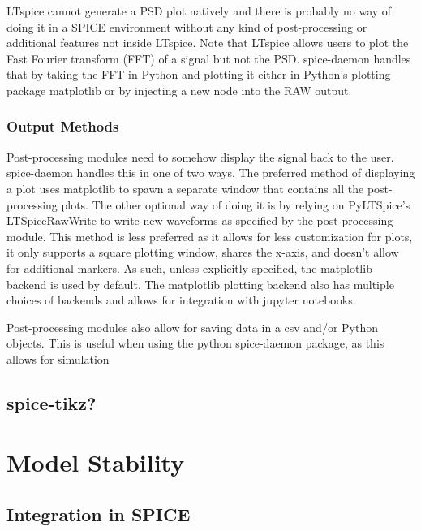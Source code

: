 \documentclass{article}
\newcommand{\todoexplain}[2][]{\todo[color=purple!40, #1]{\textbf{add details:}\\#2}}
\newcommand{\cf}[1]{\textsf{#1}}
\begin{document}
LTspice cannot generate a PSD plot natively and there is probably no way of doing it in a SPICE
environment without any kind of post-processing or additional features not inside LTspice.
Note that LTspice allows users to plot the Fast Fourier transform (FFT) of a signal but not the 
PSD. spice-daemon handles that by taking the FFT in Python and plotting it either in Python's 
plotting package \cf{matplotlib} or by injecting a new node into the RAW output. 


\subsubsection{Output Methods}

Post-processing modules need to somehow display the signal back to the user. spice-daemon handles this
in one of two ways. The preferred method of displaying a plot uses matplotlib to spawn a separate window
that contains all the post-processing plots. The other optional way of doing it is by relying on 
\cf{PyLTSpice}'s \cf{LTSpiceRawWrite} to write new waveforms as specified by the post-processing module.
This method is less preferred as it allows for less customization for plots, it only supports a square
plotting window, shares the x-axis, and doesn't allow for additional markers. As such, unless explicitly
specified, the matplotlib backend is used by default. The matplotlib plotting backend also has multiple 
choices of backends and allows for integration with jupyter notebooks. 

Post-processing modules also allow for saving data in a csv and/or Python objects. This is useful when using
the python spice-daemon package, as this allows for simulation 
\todoexplain[]{finish thought...}

\subsection{spice-tikz?}

\section{Model Stability} \label{stability}

\subsection{Integration in SPICE}
\end{document}
